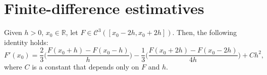\chapter{Finite-difference estimatives}
\label{anexo-fd}


\begin{lema}
	\label{lemma:fd-est1}
	Given $h>0$, $x_0 \in \mathbb{R}$, let $F \in \mathcal{C}^{3}([x_0-2h,x_0+2h])$.
	Then, the following identity holds:
	\begin{equation}	
		\label{lemma:fd-est1-eq0}
		F'(x_0) =  \frac{2}{3} \bigg(\frac{F(x_0+h) - F(x_0-h)}{h}\bigg)
                      - \frac{1}{3} \bigg(\frac{F(x_0+2h) - F(x_0-2h)}{4h}\bigg)
		      + Ch^2,
	\end{equation}
	where $C$ is a constant that depends only on $F$ and $h$.
\end{lema}

